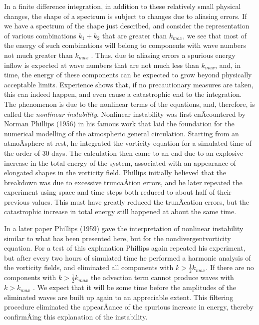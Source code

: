 In a finite difference integration, in addition to these relatively
small physical changes, the shape of a spectrum is subject to changes
due to aliasing errors. If we have a spectrum of the shape just
described, and consider the representation of various combinations
\(k_1+k_2\) that are greater than \(k_{max}\), we see that most of the
energy of such combinations will belong to components with wave numbers
not much greater than \(k_{max}\) . Thus, due to aliasing errors a
spurious energy inflow is expected at wave numbers that are not much
less than \(k_{max}\), and, in time, the energy of these components can
be expected to grow beyond physically acceptable limits. Experience
shows that, if no precautionary measures are taken, this can indeed
happen, and even cause a catastrophic end to the integration. The
phenomenon is due to the nonlinear terms of the equations, and,
therefore, is called the \emph{nonlinear instability}. Nonlinear
instability was first enÂ­countered by Norman Phillips (1956) in his
famous work that laid the foundation for the numerical modelling of the
atmospheric general circulation. Starting from an atmoÂ­sphere at rest,
he integrated the vorticity equation for a simulated time of the order
of 30 days. The calculation then came to an end due to an explosive
increase in the total energy of the system, associated with an
appearance of elongated shapes in the vorticity field. Phillips
initially believed that the breakdown was due to excessive truncaÂ­tion
errors, and he later repeated the experiment using space and time steps
both reduced to about half of their previous values. This must have
greatly reduced the trunÂ­cation errors, but the catastrophic increase in
total energy still happened at about the same time.

In a later paper Phillips (1959) gave the interpretation of nonlinear
instability similar to what has been presented here, but for the
nondivergentvorticity equation. For a test of this explanation Phillips
again repeated his experiment, but after every two hours of simulated
time he performed a harmonic analysis of the vorticity fields, and
eliminated all components with \(k > \frac{1}{2}k_{max}\). If there are
no components with \(k > \frac{1}{2}k_{max}\) the advection term cannot
produce waves with \(k > k_{max}\) . We expect that it will be some time
before the amplitudes of the eliminated waves are built up again to an
appreciable extent. This filtering procedure eliminated the appearÂ­ance
of the spurious increase in energy, thereby confirmÂ­ing this explanation
of the instability.

